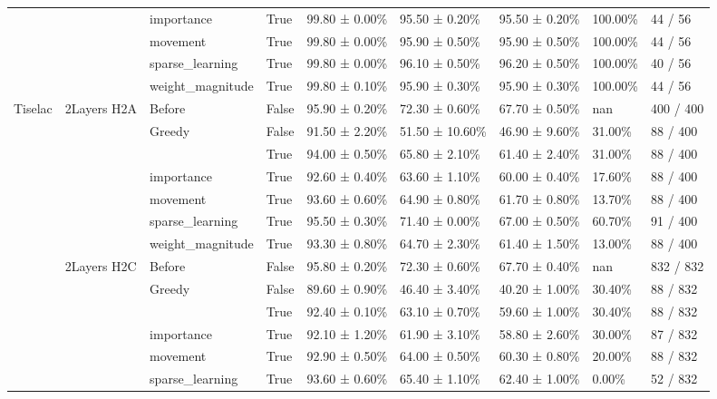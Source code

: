 \begin{tabular}{lllllllll}
\cline{3-9}
 &  & importance & True & 99.80 ± 0.00\% & 95.50 ± 0.20\% & 95.50 ± 0.20\% & 100.00\% & 44 / 56 \\
\cline{3-9}
 &  & movement & True & 99.80 ± 0.00\% & 95.90 ± 0.50\% & 95.90 ± 0.50\% & 100.00\% & 44 / 56 \\
\cline{3-9}
 &  & sparse\_learning & True & 99.80 ± 0.00\% & 96.10 ± 0.50\% & 96.20 ± 0.50\% & 100.00\% & 40 / 56 \\
\cline{3-9}
 &  & weight\_magnitude & True & 99.80 ± 0.10\% & 95.90 ± 0.30\% & 95.90 ± 0.30\% & 100.00\% & 44 / 56 \\
\cline{1-9} \cline{2-9} \cline{3-9}
\multirow[t]{35}{*}{Tiselac} & \multirow[t]{7}{*}{2Layers H2A} & Before & False & 95.90 ± 0.20\% & 72.30 ± 0.60\% & 67.70 ± 0.50\% & nan & 400 / 400 \\
\cline{3-9}
 &  & \multirow[t]{2}{*}{Greedy} & False & 91.50 ± 2.20\% & 51.50 ± 10.60\% & 46.90 ± 9.60\% & 31.00\% & 88 / 400 \\
 &  &  & True & 94.00 ± 0.50\% & 65.80 ± 2.10\% & 61.40 ± 2.40\% & 31.00\% & 88 / 400 \\
\cline{3-9}
 &  & importance & True & 92.60 ± 0.40\% & 63.60 ± 1.10\% & 60.00 ± 0.40\% & 17.60\% & 88 / 400 \\
\cline{3-9}
 &  & movement & True & 93.60 ± 0.60\% & 64.90 ± 0.80\% & 61.70 ± 0.80\% & 13.70\% & 88 / 400 \\
\cline{3-9}
 &  & sparse\_learning & True & 95.50 ± 0.30\% & 71.40 ± 0.00\% & 67.00 ± 0.50\% & 60.70\% & 91 / 400 \\
\cline{3-9}
 &  & weight\_magnitude & True & 93.30 ± 0.80\% & 64.70 ± 2.30\% & 61.40 ± 1.50\% & 13.00\% & 88 / 400 \\
\cline{2-9} \cline{3-9}
 & \multirow[t]{7}{*}{2Layers H2C} & Before & False & 95.80 ± 0.20\% & 72.30 ± 0.60\% & 67.70 ± 0.40\% & nan & 832 / 832 \\
\cline{3-9}
 &  & \multirow[t]{2}{*}{Greedy} & False & 89.60 ± 0.90\% & 46.40 ± 3.40\% & 40.20 ± 1.00\% & 30.40\% & 88 / 832 \\
 &  &  & True & 92.40 ± 0.10\% & 63.10 ± 0.70\% & 59.60 ± 1.00\% & 30.40\% & 88 / 832 \\
\cline{3-9}
 &  & importance & True & 92.10 ± 1.20\% & 61.90 ± 3.10\% & 58.80 ± 2.60\% & 30.00\% & 87 / 832 \\
\cline{3-9}
 &  & movement & True & 92.90 ± 0.50\% & 64.00 ± 0.50\% & 60.30 ± 0.80\% & 20.00\% & 88 / 832 \\
\cline{3-9}
 &  & sparse\_learning & True & 93.60 ± 0.60\% & 65.40 ± 1.10\% & 62.40 ± 1.00\% & 0.00\% & 52 / 832 \\

\end{tabular}
